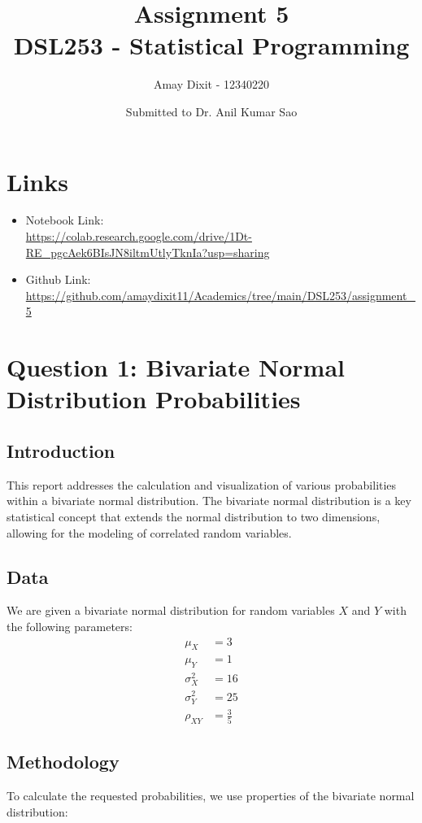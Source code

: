 \documentclass[12pt]{article}
\title{Assignment 5 \\ DSL253 - Statistical Programming}
\author{Amay Dixit - 12340220}
\date{Submitted to Dr. Anil Kumar Sao}
\begin{document}
\maketitle

\section*{Links}
\begin{sloppypar}
\begin{itemize}
    \item Notebook Link: \\ \url{https://colab.research.google.com/drive/1Dt-RE_pgcAek6BIsJN8iltmUtlyTknIa?usp=sharing}
    \item Github Link: \\ \url{https://github.com/amaydixit11/Academics/tree/main/DSL253/assignment_5}
\end{itemize}
\end{sloppypar}

\section{Question 1: Bivariate Normal Distribution Probabilities}

\subsection{Introduction}
This report addresses the calculation and visualization of various probabilities within a bivariate normal distribution. The bivariate normal distribution is a key statistical concept that extends the normal distribution to two dimensions, allowing for the modeling of correlated random variables.

\subsection{Data}
We are given a bivariate normal distribution for random variables $X$ and $Y$ with the following parameters:
\begin{align*}
\mu_X &= 3 \\
\mu_Y &= 1 \\
\sigma_X^2 &= 16 \\
\sigma_Y^2 &= 25 \\
\rho_{XY} &= \frac{3}{5}
\end{align*}

\subsection{Methodology}
To calculate the requested probabilities, we use properties of the bivariate normal distribution:
\end{document}

